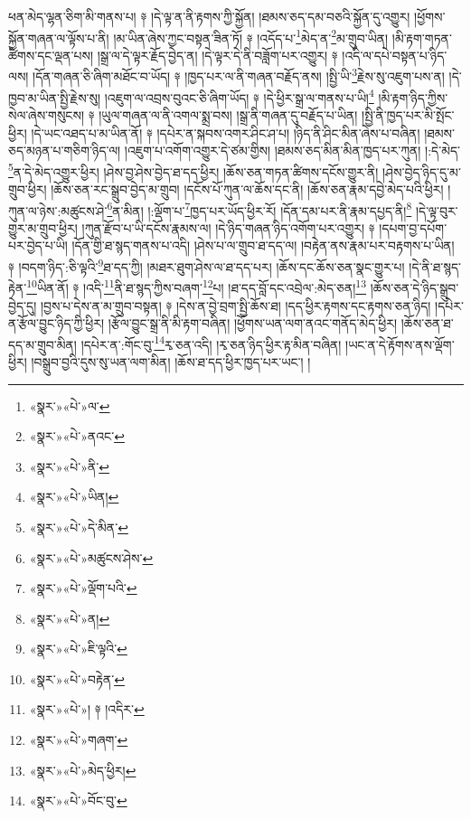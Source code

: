 ཕན་མེད་ལྷན་ཅིག་མི་གནས་པ། ༈ །དེ་ལྟ་ན་ནི་རྟགས་ཀྱི་སྐྱོན། །ཐམས་ཅད་དམ་བཅའི་སྐྱོན་དུ་འགྱུར། །ཕྱོགས་སྐྱོན་གཞན་ལ་ལྟོས་པ་ནི། །མ་ཡིན་ཞེས་ཀྱང་བསྟན་ཟིན་ཏོ། ༈ །འདོད་པ་\footnote{«སྣར་»«པེ་»ལ་}མེད་ན་\footnote{«སྣར་»«པེ་»ནའང་}མ་གྲུབ་ཡིན། །མི་རྟག་གཏན་ཚིགས་དང་ལྡན་པས། །སྒྲ་ལ་དེ་ལྟར་རྗོད་བྱེད་ན། །དེ་ལྟར་དེ་ནི་བཟློག་པར་འགྱུར། ༈ །འདི་ལ་དཔེ་བསྟན་པ་ཉིད་ལས། །དོན་གཞན་ཅི་ཞིག་མཐོང་བ་ཡོད། ༈ །ཁྱད་པར་ལ་ནི་གཞན་བརྗོད་ནས། །སྤྱི་ཡི་\footnote{«སྣར་»«པེ་»ནི་}རྗེས་སུ་འཇུག་པས་ན། །དེ་ཁྱབ་མ་ཡིན་སྤྱི་རྗེས་སུ། །འཇུག་ལ་འབྲས་བུའང་ཅི་ཞིག་ཡོད། ༈ །དེ་ཕྱིར་སྒྲ་ལ་གནས་པ་ཡི།\footnote{«སྣར་»«པེ་»ཡིན།} །མི་རྟག་ཉིད་ཀྱིས་སེལ་ཞེས་གསུངས། ༈ །ཡུལ་གཞན་ལ་ནི་འགལ་སྨྲ་བས། །སྒྲ་ནི་གཞན་དུ་བརྗོད་པ་ཡིན། །སྤྱི་ནི་ཁྱད་པར་མི་སྤོང་ཕྱིར། །དེ་ཡང་འཐད་པ་མ་ཡིན་ནོ། ༈ །དཔེར་ན་སྐབས་འགར་ཤིང་ཤ་པ། །ཉིད་ནི་ཤིང་མིན་ཞེས་པ་བཞིན། །ཐམས་ཅད་མཉན་པ་གཅིག་ཉིད་ལ། །འཇུག་པ་འགོག་འགྱུར་དེ་ཙམ་གྱིས། །ཐམས་ཅད་མིན་མིན་ཁྱད་པར་ཀུན། །:དེ་མེད་\footnote{«སྣར་»«པེ་»དེ་མིན་}ན་དེ་མེད་འགྱུར་ཕྱིར། །ཤེས་བྱ་ཤེས་བྱེད་ཐ་དད་ཕྱིར། །ཆོས་ཅན་གཏན་ཚིགས་དངོས་གྱུར་ནི། །ཤེས་བྱེད་ཉིད་དུ་མ་གྲུབ་ཕྱིར། །ཆོས་ཅན་རང་སྒྲུབ་བྱེད་མ་གྲུབ། །དངོས་པོ་ཀུན་ལ་ཆོས་དང་ནི། །ཆོས་ཅན་རྣམ་དབྱེ་མེད་པའི་ཕྱིར། །ཀུན་ལ་ཉེས་:མཚུངས་ཤེ་\footnote{«སྣར་»«པེ་»མཚུངས་ཤེས་}ན་མིན། །:ལྡོག་པ་\footnote{«སྣར་»«པེ་»ལྡོག་པའི་}ཁྱད་པར་ཡོད་ཕྱིར་རོ། །དོན་དམ་པར་ནི་རྣམ་དཔྱད་ནི།\footnote{«སྣར་»«པེ་»ན།} །དེ་ལྟ་བུར་གྱུར་མ་གྲུབ་ཕྱིར། །ཀུན་རྫོབ་པ་ཡི་དངོས་རྣམས་ལ། །དེ་ཉིད་གཞན་ཉིད་འགོག་པར་འགྱུར། ༈ །དཔག་བྱ་དཔོག་པར་བྱེད་པ་ཡི། །དོན་གྱི་ཐ་སྙད་གནས་པ་འདི། །ཤེས་པ་ལ་གྲུབ་ཐ་དད་ལ། །བརྟེན་ནས་རྣམ་པར་བརྟགས་པ་ཡིན། ༈ །བདག་ཉིད་:ཅི་ལྟའི་\footnote{«སྣར་»«པེ་»ཇི་ལྟའི་}ཐ་དད་ཀྱི། །མཐར་ཐུག་ཤེས་ལ་ཐ་དད་པར། །ཆོས་དང་ཆོས་ཅན་སྣང་གྱུར་པ། །དེ་ནི་ཐ་སྙད་རྟེན་\footnote{«སྣར་»«པེ་»བརྟེན་}ཡིན་ནོ། ༈ །འདི་\footnote{«སྣར་»«པེ་»། ༈ །འདིར་}ནི་ཐ་སྙད་ཀྱིས་བཞག་\footnote{«སྣར་»«པེ་»གཞག་}པ། །ཐ་དད་བློ་དང་འབྲེལ་:མེད་ཅན།\footnote{«སྣར་»«པེ་»མེད་ཕྱིར།} །ཆོས་ཅན་དེ་ཉིད་སྒྲུབ་བྱེད་དུ། །བྱས་པ་དེས་ན་མ་གྲུབ་བསྟན། ༈ །དེས་ན་བྱེ་བྲག་སྤྱི་ཆོས་ཐ། །དད་ཕྱིར་རྟགས་དང་རྟགས་ཅན་ཉིད། །དཔེར་ན་རྩོལ་བྱུང་ཉིད་ཀྱི་ཕྱིར། །རྩོལ་བྱུང་སྒྲ་ནི་མི་རྟག་བཞིན། །ཕྱོགས་ཡན་ལག་ནའང་གནོད་མེད་ཕྱིར། །ཆོས་ཅན་ཐ་དད་མ་གྲུབ་མིན། །དཔེར་ན་:གོང་བུ་\footnote{«སྣར་»«པེ་»བོང་བུ་}རྭ་ཅན་འདི། །རྭ་ཅན་ཉིད་ཕྱིར་རྟ་མིན་བཞིན། །ཡང་ན་དེ་རྟོགས་ནས་ལྡོག་ཕྱིར། །བསྒྲུབ་བྱའི་དུས་སུ་ཡན་ལག་མིན། །ཆོས་ཐ་དད་ཕྱིར་ཁྱད་པར་ཡང་། །
